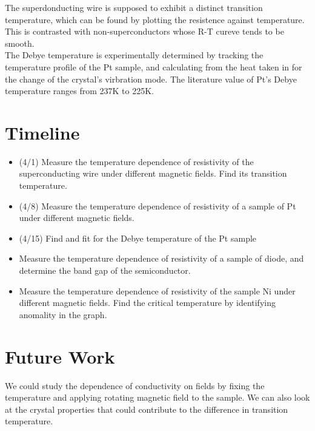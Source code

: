 \documentclass{article}
\begin{document}
\begin{normalsize}
      The superdonducting wire is supposed to exhibit a distinct transition temperature, which can be found by plotting the resistence against temperature. This is contrasted with non-superconductors whose R-T cureve tends to be smooth.\\
      The Debye temperature is experimentally determined by tracking the temperature profile of the Pt sample, and calculating from the heat taken in for the change of the crystal's virbration mode. The literature value of Pt's Debye temperature ranges from 237K to 225K.
        
    	\section{Timeline}
        \begin{itemize}
\item (4/1) Measure the temperature dependence of resistivity of the superconducting wire under different magnetic fields. Find its transition temperature.
\item(4/8) Measure the temperature dependence of resistivity of a sample of Pt under different magnetic fields. 
\item(4/15) Find and fit for the Debye temperature of the Pt sample
\item Measure the temperature dependence of resistivity of a sample of diode, and determine the band gap of the semiconductor.
\item Measure the temperature dependence of resistivity of the sample Ni under different magnetic fields. Find the critical temperature by identifying anomality in the graph.

        \end{itemize}
        
    	\section{Future Work}
        We could study the dependence of conductivity on fields by fixing the temperature and applying rotating magnetic field to the sample. We can also look at the crystal properties that could contribute to the difference in transition temperature.
\end{normalsize}
  
\end{document}
